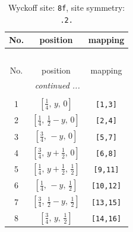 \documentclass[fleqn,8pt]{jsarticle}
\begin{document}
\begin{longtable}{ccc}
\caption{Wyckoff site: {\tt 8f}, site symmetry: {\tt .2.}}
 \\
 \hline \hline
No. & position & mapping \\ \hline \endfirsthead

\multicolumn{2}{l}{\tablename\ \thetable{}} \\
 \hline \hline
No. & position & mapping \\ \hline \endhead

 \hline \hline
\multicolumn{2}{r}{\footnotesize\it continued ...} \\ \endfoot

 \hline \hline
\multicolumn{2}{r}{} \\ \endlastfoot

1 & $\left[ \frac{1}{4},\, y,\, 0 \right]$ & {\tt [1,3]} \\ \hline
2 & $\left[ \frac{1}{4},\, \frac{1}{2} - y,\, 0 \right]$ & {\tt [2,4]} \\ \hline
3 & $\left[ \frac{3}{4},\, - y,\, 0 \right]$ & {\tt [5,7]} \\ \hline
4 & $\left[ \frac{3}{4},\, y + \frac{1}{2},\, 0 \right]$ & {\tt [6,8]} \\ \hline
5 & $\left[ \frac{1}{4},\, y + \frac{1}{2},\, \frac{1}{2} \right]$ & {\tt [9,11]} \\ \hline
6 & $\left[ \frac{1}{4},\, - y,\, \frac{1}{2} \right]$ & {\tt [10,12]} \\ \hline
7 & $\left[ \frac{3}{4},\, \frac{1}{2} - y,\, \frac{1}{2} \right]$ & {\tt [13,15]} \\ \hline
8 & $\left[ \frac{3}{4},\, y,\, \frac{1}{2} \right]$ & {\tt [14,16]} \\
\end{longtable}
\renewcommand{\arraystretch}{1.2}
\end{document}
